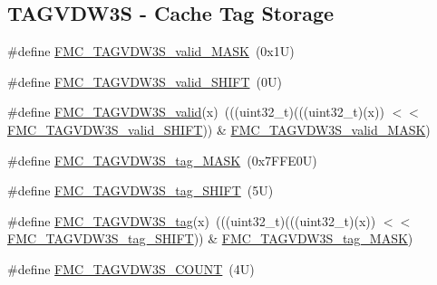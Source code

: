 \subsection*{T\+A\+G\+V\+D\+W3S -\/ Cache Tag Storage}
\begin{DoxyCompactItemize}
\item 
\#define \mbox{\hyperlink{group___f_m_c___register___masks_ga3f4eebc3416cc79b7c513a836b8b670b}{F\+M\+C\+\_\+\+T\+A\+G\+V\+D\+W3\+S\+\_\+valid\+\_\+\+M\+A\+SK}}~(0x1\+U)
\item 
\#define \mbox{\hyperlink{group___f_m_c___register___masks_gae63177b0f086e164153f0b5f7240f11f}{F\+M\+C\+\_\+\+T\+A\+G\+V\+D\+W3\+S\+\_\+valid\+\_\+\+S\+H\+I\+FT}}~(0\+U)
\item 
\#define \mbox{\hyperlink{group___f_m_c___register___masks_gaebf126b4f1f90455e4f667a2ed10ff20}{F\+M\+C\+\_\+\+T\+A\+G\+V\+D\+W3\+S\+\_\+valid}}(x)~(((uint32\+\_\+t)(((uint32\+\_\+t)(x)) $<$$<$ \mbox{\hyperlink{group___f_m_c___register___masks_gae63177b0f086e164153f0b5f7240f11f}{F\+M\+C\+\_\+\+T\+A\+G\+V\+D\+W3\+S\+\_\+valid\+\_\+\+S\+H\+I\+FT}})) \& \mbox{\hyperlink{group___f_m_c___register___masks_ga3f4eebc3416cc79b7c513a836b8b670b}{F\+M\+C\+\_\+\+T\+A\+G\+V\+D\+W3\+S\+\_\+valid\+\_\+\+M\+A\+SK}})
\item 
\#define \mbox{\hyperlink{group___f_m_c___register___masks_ga541edb8adcd9202130abaea64cd8bf9a}{F\+M\+C\+\_\+\+T\+A\+G\+V\+D\+W3\+S\+\_\+tag\+\_\+\+M\+A\+SK}}~(0x7\+F\+F\+E0\+U)
\item 
\#define \mbox{\hyperlink{group___f_m_c___register___masks_ga575e10b20b9366a19e6cbc839fc3353b}{F\+M\+C\+\_\+\+T\+A\+G\+V\+D\+W3\+S\+\_\+tag\+\_\+\+S\+H\+I\+FT}}~(5\+U)
\item 
\#define \mbox{\hyperlink{group___f_m_c___register___masks_gab4e42df87d80871e55707c4fa55d7ac5}{F\+M\+C\+\_\+\+T\+A\+G\+V\+D\+W3\+S\+\_\+tag}}(x)~(((uint32\+\_\+t)(((uint32\+\_\+t)(x)) $<$$<$ \mbox{\hyperlink{group___f_m_c___register___masks_ga575e10b20b9366a19e6cbc839fc3353b}{F\+M\+C\+\_\+\+T\+A\+G\+V\+D\+W3\+S\+\_\+tag\+\_\+\+S\+H\+I\+FT}})) \& \mbox{\hyperlink{group___f_m_c___register___masks_ga541edb8adcd9202130abaea64cd8bf9a}{F\+M\+C\+\_\+\+T\+A\+G\+V\+D\+W3\+S\+\_\+tag\+\_\+\+M\+A\+SK}})
\item 
\#define \mbox{\hyperlink{group___f_m_c___register___masks_ga5a3aff280c4872685276cd3c15cb1c87}{F\+M\+C\+\_\+\+T\+A\+G\+V\+D\+W3\+S\+\_\+\+C\+O\+U\+NT}}~(4\+U)
\end{DoxyCompactItemize}
